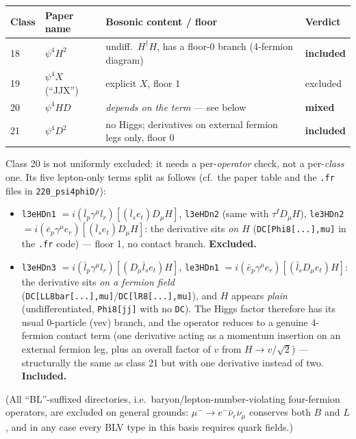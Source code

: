 \documentclass[11pt,a4paper]{article}
\begin{document}
\begin{center}
\begin{tabular}{@{}llll@{}}
\toprule
Class & Paper name & Bosonic content / floor & Verdict \\
\midrule
18 & $\psi^4H^2$ & undiff.\ $H^\dagger H$, has a floor-0 branch (4-fermion diagram) & \textbf{included} \\
19 & $\psi^4X$ (``JJX'') & explicit $X$, floor 1 & excluded \\
20 & $\psi^4HD$ & \emph{depends on the term} --- see below & \textbf{mixed} \\
21 & $\psi^4D^2$ & no Higgs; derivatives on external fermion legs only, floor 0 & \textbf{included} \\
\bottomrule
\end{tabular}
\end{center}

\label{sec:class20}
Class 20 is not uniformly excluded: it needs a per-\emph{operator} check,
not a per-\emph{class} one. Its five lepton-only terms split as follows
(cf.\ the paper table and the \texttt{.fr} files in
\texttt{220\_psi4phiD/}):
\begin{itemize}
\item \texttt{l3eHDn1} $= i(\bar l_p\gamma^\mu l_r)[(\bar l_s e_t)D_\mu H]$,
  \texttt{l3eHDn2} (same with $\tau^I D_\mu H$), \texttt{le3HDn2}
  $= i(\bar e_p\gamma^\mu e_r)[(\bar l_s e_t)D_\mu H]$: the derivative sits
  \emph{on $H$} (\texttt{DC[Phi8[...],mu]} in the \texttt{.fr} code) ---
  floor 1, no contact branch. \textbf{Excluded.}
\item \texttt{l3eHDn3} $= i(\bar l_p\gamma^\mu l_r)[(D_\mu\bar l_s e_t)H]$,
  \texttt{le3HDn1} $= i(\bar e_p\gamma^\mu e_r)[(\bar l_s D_\mu e_t)H]$: the
  derivative sits \emph{on a fermion field}
  (\texttt{DC[LL8bar[...],mu]}/\texttt{DC[lR8[...],mu]}), and $H$ appears
  \emph{plain} (undifferentiated, \texttt{Phi8[jj]} with no \texttt{DC}).
  The Higgs factor therefore has its usual 0-particle (vev) branch, and
  the operator reduces to a genuine 4-fermion contact term (one derivative
  acting as a momentum insertion on an external fermion leg, plus an
  overall factor of $v$ from $H\to v/\sqrt2$) --- structurally the same as
  class 21 but with one derivative instead of two. \textbf{Included.}
\end{itemize}
(All ``BL''-suffixed directories, i.e.\ baryon/lepton-number-violating
four-fermion operators, are excluded on general grounds: $\mu^-\to
e^-\bar\nu_e\nu_\mu$ conserves both $B$ and $L$, and in any case every BLV
type in this basis requires quark fields.)
\end{document}
